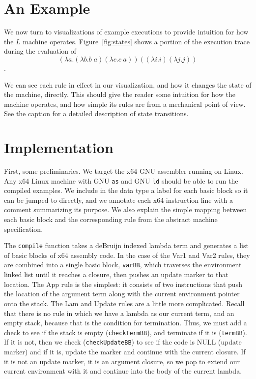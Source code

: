 \documentclass[preprint]{sigplanconf}
\begin{document}
\section{An Example}

We now turn to visualizations of example executions to provide intuition for how
the $L$ machine operates. Figure~\ref{fig:states} shows a portion of the
execution trace during the evaluation of 
$$(\lambda a.(\lambda b.b \; a) (\lambda c.c \; a)) ((\lambda i.i) (\lambda j.j))$$. 

We can see each rule in effect in our visualization, and how it changes the
state of the machine, directly. This should give the reader some intuition for
how the machine operates, and how simple its rules are from a mechanical point
of view. See the caption for a detailed description of state transitions. 

\section{Implementation}\label{sec:impl}

First, some preliminaries. We target the x64 GNU assembler running on
Linux. Any x64 Linux machine with GNU \texttt{as} and GNU \texttt{ld} should
be able to run the compiled examples.  We include in the data type a label for
each basic block so it can be jumped to directly, and we annotate each x64
instruction line with a comment summarizing its purpose.  We also explain the
simple mapping between each basic block and the corresponding rule from the
abstract machine specification.

The \texttt{compile} function takes a deBruijn indexed lambda term and
generates a list of basic blocks of x64 assembly code. In the case of the Var1
and Var2 rules, they are combined into a single basic block, \texttt{varBB},
which traverses the environment linked list until it reaches a closure, then
pushes an update marker to that location. The App rule is the simplest: it
consists of two instructions that push the location of the argument term along
with the current environment pointer onto the stack. The Lam and Update rules
are a little more complicated.  Recall that there is no rule in which we have a
lambda as our current term, and an empty stack, because that is the condition
for termination. Thus, we must add a check to see if the stack is empty
(\texttt{checkTermBB}), and terminate if it is (\texttt{termBB}). If it is not,
then we check (\texttt{checkUpdateBB}) to see if the code is NULL (update
marker) and if it is, update the marker and continue with the current closure.
If it is not an update marker, it is an argument closure, so we pop to extend
our current environment with it and continue into the body of the current
lambda.
\end{document}
